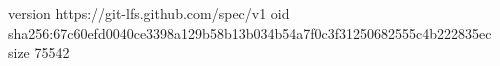 version https://git-lfs.github.com/spec/v1
oid sha256:67c60efd0040ce3398a129b58b13b034b54a7f0c3f31250682555c4b222835ec
size 75542
